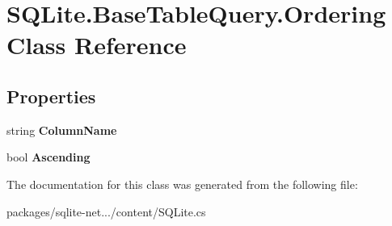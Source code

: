\hypertarget{classSQLite_1_1BaseTableQuery_1_1Ordering}{\section{S\-Q\-Lite.\-Base\-Table\-Query.\-Ordering Class Reference}
\label{classSQLite_1_1BaseTableQuery_1_1Ordering}
}
\subsection*{Properties}
\begin{DoxyCompactItemize}
\item 
\hypertarget{classSQLite_1_1BaseTableQuery_1_1Ordering_aebfa306be9632a6a53470af30f7a1e5f}{string {\bfseries Column\-Name}}\label{classSQLite_1_1BaseTableQuery_1_1Ordering_aebfa306be9632a6a53470af30f7a1e5f}

\item 
\hypertarget{classSQLite_1_1BaseTableQuery_1_1Ordering_aca9b1c1218f3e3a78805638c384b3fa5}{bool {\bfseries Ascending}}\label{classSQLite_1_1BaseTableQuery_1_1Ordering_aca9b1c1218f3e3a78805638c384b3fa5}

\end{DoxyCompactItemize}


The documentation for this class was generated from the following file\-:\begin{DoxyCompactItemize}
\item 
packages/sqlite-\/net.../content/S\-Q\-Lite.\-cs\end{DoxyCompactItemize}

